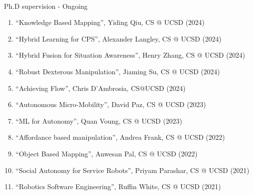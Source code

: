 \documentclass{article}
\begin{document}
\begin{cv}


\begin{cvlist}{~}

\item[Ph.D supervision - Ongoing]\ \\
  \begin{enumerate}
  \item ``Knowledge Based Mapping'', Yiding Qiu, CS @ UCSD (2024)
  \item ``Hybrid Learning for CPS'', Alexander Langley, CS @ UCSD (2024)
  \item ``Hybrid Fusion for Situation Awareness'', Henry Zhang, CS @  UCSD (2024)
  \item ``Robust Dexterous Manipulation'', Jiaming Su, CS @ UCSD (2024)
  \item ``Achieving Flow'', Chris D'Ambrosia, CS@UCSD (2024)
  \item ``Autonomous Micro-Mobility'', David Paz, CS @ UCSD (2023)
  \item ``ML for Autonomy'', Quan Voung, CS @ UCSD (2023)
  \item ``Affordance based manipulation'', Andrea Frank, CS @ UCSD (2022)
  \item ``Object Based Mapping'', Anwesan Pal, CS @ UCSD (2022)
  \item ``Social Autonomy for Service Robots'', Priyam Parashar, CS @ UCSD (2021)
  \item ``Robotics Software Engineering'', Ruffin White, CS @ UCSD (2021)
  \end{enumerate}


\end{cvlist}
\end{cv}
\end{document}
